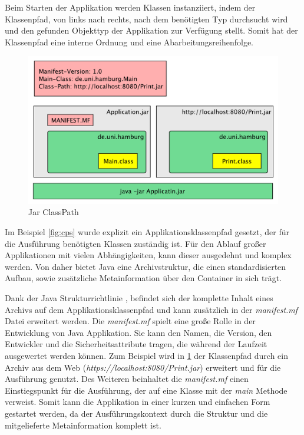   Beim Starten der Applikation werden Klassen instanziiert, indem der Klassenpfad, von links nach rechts, nach dem benötigten Typ durchsucht wird und den gefunden Objekttyp der Applikation zur Verfügung stellt. Somit hat der Klassenpfad eine interne Ordnung und eine Abarbeitungsreihenfolge. 

  \begin{figure}[h]
    \includegraphics[width=\textwidth]{material/images/Classpath-Manifest2.pdf}
    \caption{Jar ClassPath}
    \label{fig:cpa}
  \end{figure}

  Im Beispiel \ref{fig:cps} wurde explizit ein Applikationsklassenpfad gesetzt, der für die Ausführung benötigten Klassen zuständig ist. Für den Ablauf großer Applikationen mit vielen Abhängigkeiten, kann dieser ausgedehnt und komplex werden. Von daher bietet Java eine Archivstruktur, die einen standardisierten Aufbau, sowie zusätzliche Metainformation über den Container in sich trägt. 
  
  Dank der Java Strukturrichtlinie \cite{classLoadingOracle}, befindet sich der komplette Inhalt eines Archivs auf dem Applikationsklassenpfad und kann zusätzlich in der \textit{manifest.mf} Datei erweitert werden. Die \textit{manifest.mf} spielt eine große Rolle in der Entwicklung von Java Applikation. Sie kann den Namen, die Version, den Entwickler und die Sicherheitsattribute tragen, die während der Laufzeit ausgewertet werden können. Zum Beispiel wird in \ref{fig:cpa} der Klassenpfad durch ein Archiv aus dem Web (\textit{https://localhost:8080/Print.jar}) erweitert und für die Ausführung genutzt. Des Weiteren beinhaltet die \textit{manifest.mf} einen Einstiegspunkt für die Ausführung, der auf eine Klasse mit der \textit{main} Methode verweist.\newline
  Somit kann die Applikation in einer kurzen und einfachen Form gestartet werden, da der Ausführungskontext durch die Struktur und die mitgelieferte Metainformation komplett ist. \cite{classLoadingOracle}


